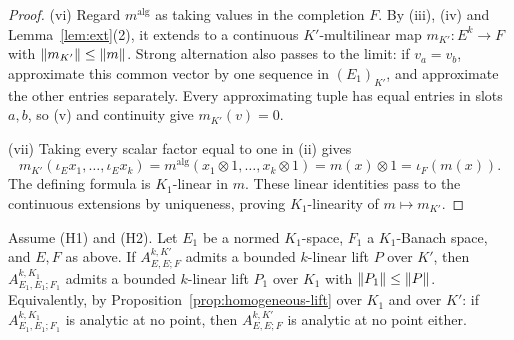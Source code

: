 \begin{proof}
\textup{(vi)} Regard $m^{\mathrm{alg}}$ as taking values in the completion $F$.
By \textup{(iii)}, \textup{(iv)} and Lemma~\ref{lem:ext}(2), it extends to a continuous
$K'$\nobreakdash-multilinear map $m_{K'}\colon E^k\to F$ with $\lVert m_{K'}\rVert\le\lVert m\rVert$.
Strong alternation also passes to the limit: if $v_a=v_b$, approximate this common vector by one sequence in
$(E_1)_{K'}$, and approximate the other entries separately. Every approximating tuple has equal entries in
slots $a,b$, so \textup{(v)} and continuity give $m_{K'}(v)=0$.

\textup{(vii)} Taking every scalar factor equal to one in \textup{(ii)} gives
\[
m_{K'}(\iota_Ex_1,\dots,\iota_Ex_k)
=m^{\mathrm{alg}}(x_1\otimes1,\dots,x_k\otimes1)
=m(x)\otimes1=\iota_F(m(x)).
\]
The defining formula is $K_1$\nobreakdash-linear in $m$. These linear identities pass to the continuous
extensions by uniqueness, proving $K_1$\nobreakdash-linearity of $m\mapsto m_{K'}$.
\end{proof}

\begin{proposition}\label{prop:ascent}
Assume \textup{(H1)} and \textup{(H2)}. Let $E_1$ be a normed $K_1$\nobreakdash-space, $F_1$ a $K_1$\nobreakdash-Banach space, and $E,F$ as
above. If $A^{k,K'}_{E,E;F}$ admits a bounded $k$\nobreakdash-linear lift $P$ over $K'$, then $A^{k,K_1}_{E_1,E_1;F_1}$ admits a
bounded $k$\nobreakdash-linear lift $P_1$ over $K_1$ with $\lVert P_1\rVert\le\lVert P\rVert$. Equivalently, by Proposition~\ref{prop:homogeneous-lift} over $K_1$ and over
$K'$: if $A^{k,K_1}_{E_1,E_1;F_1}$ is analytic at no point, then $A^{k,K'}_{E,E;F}$ is analytic at no point either.
\end{proposition}

